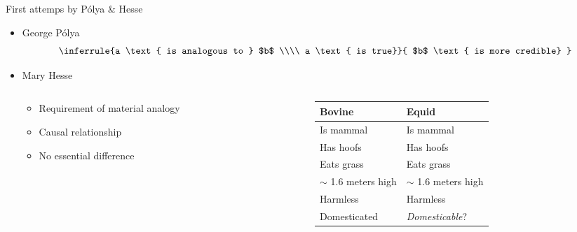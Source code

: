 \documentclass{beamer}
\begin{document}
\begin{frame}{First attemps by P\'olya \& Hesse}
  \begin{itemize}
    \item \alert{George P\'olya} \cite{Pol54}
    $$
    \inferrule{a \text{ is analogous to } $b$ \\\\ a \text{ is true}}{ $b$
      \text{ is more credible} }
    $$

  \item \alert{Mary Hesse}  \cite{Hes66}
    {\tiny
    \begin{columns}
      \begin{column}{0.4\textwidth}
        \begin{itemize}
          \item Requirement of material analogy
          \item Causal relationship
          \item No essential difference
        \end{itemize}
      \end{column}
      \begin{column}{0.4\textwidth}
        \begin{table}[t]
          \centering
          \begin{tabular}{ll}
            \toprule
            Bovine & Equid\\
            \midrule
            Is mammal & Is mammal\\
            Has hoofs & Has hoofs\\
            Eats grass & Eats grass\\
            $\sim$ 1.6 meters high & $\sim$ 1.6 meters high\\
            Harmless & Harmless\\
            Domesticated & \textit{Domesticable}?\\
            \bottomrule
          \end{tabular}
        \end{table}
      \end{column}
      \end{columns}
      }
  \end{itemize}
\end{frame}
\end{document}
